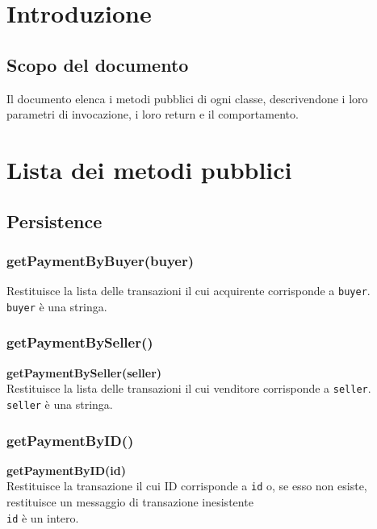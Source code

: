 \documentclass[a4paper, 12pt]{article}
\begin{document}
\makefrontpage

\makeversioni

\section{Introduzione}
\subsection{Scopo del documento}
Il documento elenca i metodi pubblici di ogni classe, descrivendone i loro parametri di invocazione, i loro return e il comportamento.

\section{Lista dei metodi pubblici}
\subsection{Persistence}

\newcommand\linkServerManager{https://github.com/iota97/WinningSoftwareSolution/blob/main/server/Server/ServerManager.ts?}

\subsubsection{getPaymentByBuyer(buyer)}
Restituisce la lista delle transazioni il cui acquirente corrisponde a \texttt{buyer}. \\
\texttt{buyer} è una stringa.

\subsubsection{getPaymentBySeller()}
\textbf{getPaymentBySeller(seller)} \\
Restituisce la lista delle transazioni il cui venditore corrisponde a \texttt{seller}. \\
\texttt{seller} è una stringa.

\subsubsection{getPaymentByID()}
\textbf{getPaymentByID(id)} \\
Restituisce la transazione il cui ID corrisponde a \texttt{id} o, se esso non esiste, restituisce un messaggio di transazione inesistente \\
\texttt{id} è un intero.
\end{document}
